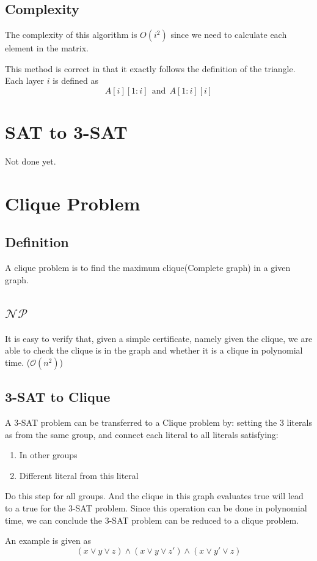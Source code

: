 \documentclass[A4paper]{article}
\begin{document}
\subsection{Complexity}
The complexity of this algorithm is $O(i^2)$ since we need to calculate each element in the matrix.

This method is correct in that it exactly follows the definition of the triangle. Each layer $i$ is defined as 
\[
	A[i][1:i] \ \ \text{and} \ \ A[1:i][i]
\]
\section{SAT to 3-SAT}
Not done yet.
\section{Clique Problem}
\subsection{Definition}
A clique problem is to find the maximum clique(Complete graph) in a given graph.
\subsection{$\mathcal{NP}$}
It is easy to verify that, given a simple certificate, namely given the clique, we are able to check the clique is in the graph and whether it is a clique in polynomial time. ($\mathcal{O}(n^2)$)
\subsection{3-SAT to Clique}
A 3-SAT problem can be transferred to a Clique problem by: setting the 3 literals as from the same group, and connect each literal to all literals satisfying:
\begin{enumerate}
\item In other groups
\item Different literal from this literal
\end{enumerate}
Do this step for all groups. And the clique in this graph evaluates true will lead to a true for the 3-SAT problem. Since this operation can be done in polynomial time, we can conclude the 3-SAT problem can be reduced to a clique problem.

An example is given as 
\[
	(x \lor y \lor z ) \land  (x \lor y \lor z' ) \land (x \lor y' \lor z )
\]
\end{document}
